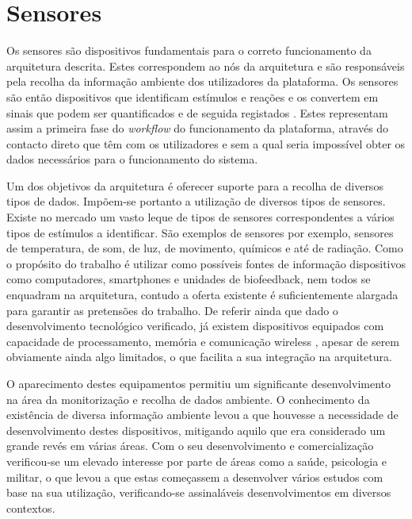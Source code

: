 \section{Sensores}

Os sensores são dispositivos fundamentais para o correto funcionamento da arquitetura descrita. Estes correspondem ao nós da arquitetura e são responsáveis pela recolha da informação ambiente dos utilizadores da plataforma. Os sensores são então dispositivos que identificam estímulos e reações e os convertem em sinais que podem ser quantificados e de seguida registados \cite{akyildiz2002wireless}. Estes representam assim a primeira fase do \textit{workflow} do funcionamento da plataforma, através do contacto direto que têm com os utilizadores e sem a qual seria impossível obter os dados necessários para o funcionamento do sistema.

Um dos objetivos da arquitetura é oferecer suporte para a recolha de diversos tipos de dados. Impõem-se portanto a utilização de diversos tipos de sensores. Existe no mercado um vasto leque de tipos de sensores correspondentes a vários tipos de estímulos a identificar. São exemplos de sensores por exemplo, sensores de temperatura, de som, de luz, de movimento, químicos e até de radiação. Como o propósito do trabalho é utilizar como possíveis fontes de informação dispositivos como computadores, smartphones e unidades de biofeedback, nem todos se enquadram na arquitetura, contudo a oferta existente é suficientemente alargada para garantir as pretensões do trabalho. De referir ainda que dado o desenvolvimento tecnológico verificado, já existem dispositivos equipados com capacidade de processamento, memória e comunicação wireless \cite{akyildiz2002wireless}, apesar de serem obviamente ainda algo limitados, o que facilita a sua integração na arquitetura.

O aparecimento destes equipamentos permitiu um significante desenvolvimento na área da monitorização e recolha de dados ambiente\cite{himakashi2012wireless}. O conhecimento da existência de diversa informação ambiente levou a que houvesse a necessidade de desenvolvimento destes dispositivos, mitigando aquilo que era considerado um grande revés em várias áreas. Com o seu desenvolvimento e comercialização verificou-se um elevado interesse por parte de áreas como a saúde, psicologia e militar, o que levou a que estas começassem a desenvolver vários estudos com base na sua utilização, verificando-se assinaláveis desenvolvimentos em diversos contextos\cite{himakashi2012wireless}.


